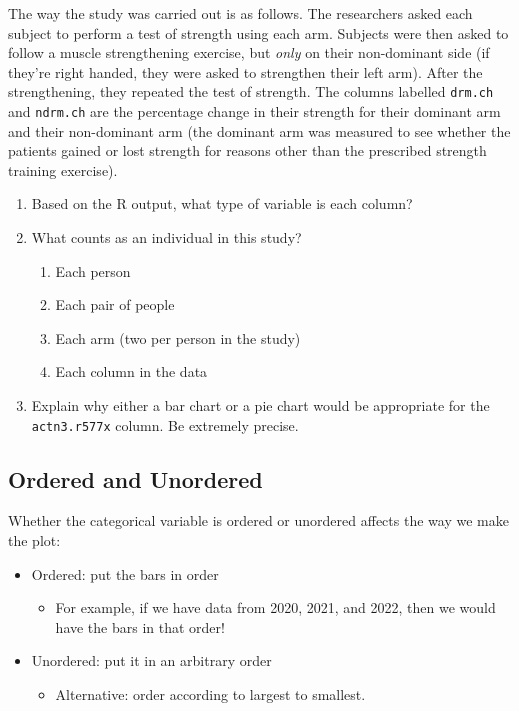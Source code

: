 \documentclass[
  letterpaper,
  DIV=11,
  numbers=noendperiod,
  oneside]{scrreprt}
\providecommand{\tightlist}{%
  \setlength{\itemsep}{0pt}\setlength{\parskip}{0pt}}\usepackage{longtable,booktabs,array}
\begin{document}
The way the study was carried out is as follows. The researchers asked
each subject to perform a test of strength using each arm. Subjects were
then asked to follow a muscle strengthening exercise, but \emph{only} on
their non-dominant side (if they're right handed, they were asked to
strengthen their left arm). After the strengthening, they repeated the
test of strength. The columns labelled \texttt{drm.ch} and
\texttt{ndrm.ch} are the percentage change in their strength for their
dominant arm and their non-dominant arm (the dominant arm was measured
to see whether the patients gained or lost strength for reasons other
than the prescribed strength training exercise).

\begin{enumerate}
\def\labelenumi{\arabic{enumi}.}
\tightlist
\item
  Based on the R output, what type of variable is each column?
\item
  What counts as an individual in this study?

  \begin{enumerate}
  \def\labelenumii{\alph{enumii}.}
  \tightlist
  \item
    Each person
  \item
    Each pair of people
  \item
    Each arm (two per person in the study)
  \item
    Each column in the data
  \end{enumerate}
\item
  Explain why either a bar chart or a pie chart would be appropriate for
  the \texttt{actn3.r577x} column. Be extremely precise.
\end{enumerate}

\hypertarget{ordered-and-unordered}{%
\subsection{Ordered and Unordered}\label{ordered-and-unordered}}

Whether the categorical variable is ordered or unordered affects the way
we make the plot:

\begin{itemize}
\tightlist
\item
  Ordered: put the bars in order

  \begin{itemize}
  \tightlist
  \item
    For example, if we have data from 2020, 2021, and 2022, then we
    would have the bars in that order!
  \end{itemize}
\item
  Unordered: put it in an arbitrary order

  \begin{itemize}
  \tightlist
  \item
    Alternative: order according to largest to smallest.
  \end{itemize}
\end{itemize}
\end{document}
